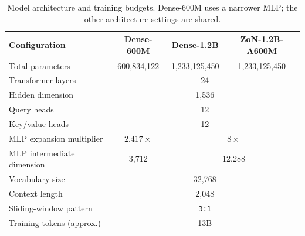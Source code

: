 \begin{table}[t]
\caption{Model architecture and training budgets. Dense-600M uses a narrower MLP; the other architecture settings are shared.}
\label{tab:zon_architecture}
\begin{center}
\small
\setlength{\tabcolsep}{4pt}
\begin{tabular}{lccc}
\toprule
\textbf{Configuration} & \textbf{Dense-600M} & \textbf{Dense-1.2B} & \textbf{ZoN-1.2B-A600M} \\
\midrule
Total parameters & 600,834,122 & 1,233,125,450 & 1,233,125,450 \\
Transformer layers & \multicolumn{3}{c}{24} \\
Hidden dimension & \multicolumn{3}{c}{1,536} \\
Query heads & \multicolumn{3}{c}{12} \\
Key/value heads & \multicolumn{3}{c}{12} \\
MLP expansion multiplier & $2.417\times$ & \multicolumn{2}{c}{$8\times$} \\
MLP intermediate dimension & 3,712 & \multicolumn{2}{c}{12,288} \\
Vocabulary size & \multicolumn{3}{c}{32,768} \\
Context length & \multicolumn{3}{c}{2,048} \\
Sliding-window pattern & \multicolumn{3}{c}{\texttt{3:1}} \\
\midrule
Training tokens (approx.) & \multicolumn{3}{c}{13B} \\
\bottomrule
\end{tabular}
\end{center}
\end{table}
